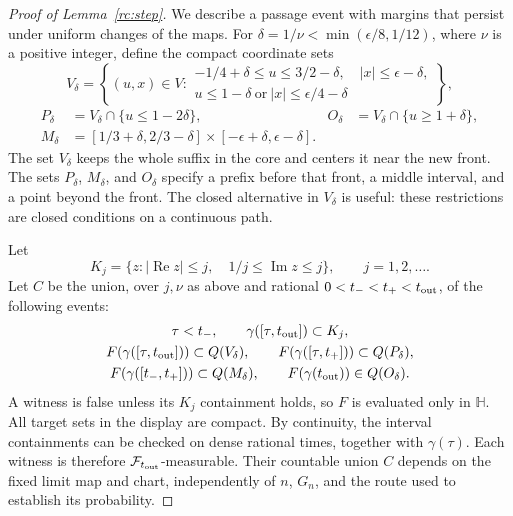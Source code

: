 \documentclass[11pt]{article}
\theoremstyle{definition}
\theoremstyle{remark}
\numberwithin{equation}{section}
\begin{document}
\begin{proof}[Proof of Lemma~\ref{rc:step}]
We describe a passage event with margins that persist under uniform
changes of the maps. For $\delta=1/\nu<\min(\epsilon/8,1/12)$, where
$\nu$ is a positive integer, define the compact coordinate sets
\[
 V_\delta=\left\{(u,x)\in V:
 \begin{gathered}
 -1/4+\delta\le u\le3/2-\delta,\quad |x|\le\epsilon-\delta,\\
 u\le1-\delta\ \text{or}\ |x|\le\epsilon/4-\delta
 \end{gathered}\right\},
\]
\[
 \begin{aligned}
 P_\delta&=V_\delta\cap\{u\le1-2\delta\},&
 O_\delta&=V_\delta\cap\{u\ge1+\delta\},\\
 M_\delta&=[1/3+\delta,2/3-\delta]
                  \times[-\epsilon+\delta,\epsilon-\delta].
 \end{aligned}
\]
The set $V_\delta$ keeps the whole suffix in the core and centers it
near the new front. The sets $P_\delta$, $M_\delta$, and $O_\delta$
specify a prefix before that front, a middle interval, and a point
beyond the front. The closed alternative in $V_\delta$ is useful:
these restrictions are closed conditions on a continuous path.

Let
\[
 K_j=\{z:|\operatorname{Re}z|\le j,\quad
                1/j\le\operatorname{Im}z\le j\},\qquad j=1,2,\ldots.
\]
Let $C$ be the union, over $j,\nu$ as above and rational
$0<t_-<t_+<t_{\rm out}$, of the following events:
\[
 \begin{gathered}
 \tau<t_-,\qquad \gamma([\tau,t_{\rm out}])\subset K_j,\\
 F(\gamma([\tau,t_{\rm out}]))\subset Q(V_\delta),\qquad
 F(\gamma([\tau,t_+]))\subset Q(P_\delta),\\
 F(\gamma([t_-,t_+]))\subset Q(M_\delta),\qquad
 F(\gamma(t_{\rm out}))\in Q(O_\delta).
 \end{gathered}
\]
A witness is false unless its $K_j$ containment holds, so $F$ is
evaluated only in $\mathbb H$. All target sets in the display are
compact. By continuity, the interval containments can be checked on
dense rational times, together with $\gamma(\tau)$. Each witness is
therefore $\mathcal F_{t_{\rm out}}$-measurable. Their countable union
$C$ depends on the fixed limit map and chart, independently of $n$,
$G_n$, and the route used to establish its probability.


\end{proof}
\end{document}
